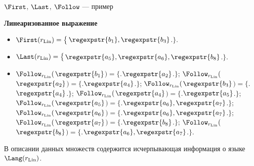 \begin{frame}{$\First$, $\Last$, $\Follow$ --- пример}
{  \begin{exampleblock}{\bf Линеаризованное выражение}
    \begin{itemize}
      \item $\First(r_{\rm Lin})=\bigl\lbrace\bigr.${}$\regexpstr{b_{1}},\regexpstr{b_{3}}${}$\bigl.\bigr\rbrace$. %
      \item $\Last(r_{\rm Lin})=\bigl\lbrace\bigr.${}$\regexpstr{a_{5}},\regexpstr{a_{6}},\regexpstr{b_{8}}${}$\bigl.\bigr\rbrace$. %
      \item $\Follow_{r_{\rm Lin}}(${}$\regexpstr{b_{1}}${}$)=\bigl\lbrace\bigr.${}$\regexpstr{a_{2}}${}$\bigl.\bigr\rbrace$; $\Follow_{r_{\rm Lin}}(${}$\regexpstr{a_{2}}${}$)=\bigl\lbrace\bigr.${}$\regexpstr{a_{4}}${}$\bigl.\bigr\rbrace$; $\Follow_{r_{\rm Lin}}(${}$\regexpstr{b_{3}}${}$)=\bigl\lbrace\bigr.${}$\regexpstr{a_{4}}${}$\bigl.\bigr\rbrace$; $\Follow_{r_{\rm Lin}}(${}$\regexpstr{a_{4}}${}$)=\bigl\lbrace\bigr.${}$\regexpstr{a_{5}}${}$\bigl.\bigr\rbrace$; $\Follow_{r_{\rm Lin}}(${}$\regexpstr{a_{5}}${}$)=\bigl\lbrace\bigr.${}$\regexpstr{a_{6}},\regexpstr{a_{7}}${}$\bigl.\bigr\rbrace$; $\Follow_{r_{\rm Lin}}(${}$\regexpstr{a_{6}}${}$)=\bigl\lbrace\bigr.${}$\regexpstr{a_{6}},\regexpstr{a_{7}}${}$\bigl.\bigr\rbrace$; $\Follow_{r_{\rm Lin}}(${}$\regexpstr{a_{7}}${}$)=\bigl\lbrace\bigr.${}$\regexpstr{b_{8}}${}$\bigl.\bigr\rbrace$; $\Follow_{r_{\rm Lin}}(${}$\regexpstr{b_{8}}${}$)=\bigl\lbrace\bigr.${}$\regexpstr{a_{6}},\regexpstr{a_{7}}${}$\bigl.\bigr\rbrace$. %
    \end{itemize}
  \end{exampleblock}
  В описании данных множеств содержится исчерпывающая информация о языке $\Lang(r_{\rm Lin})$. %
  }
\end{frame}
